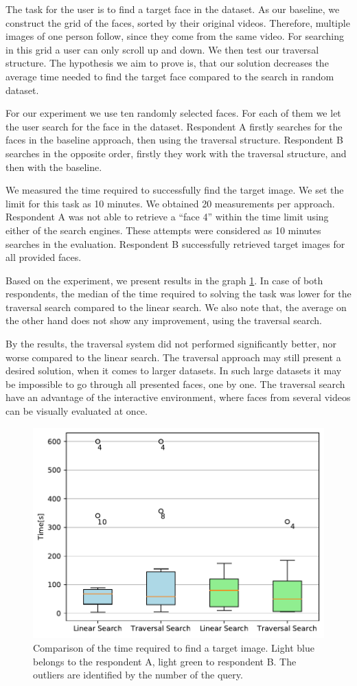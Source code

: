 The task for the user is to find a target face in the dataset. As our baseline, we construct the grid of the faces, sorted by their original videos. Therefore, multiple images of one person follow, since they come from the same video. For searching in this grid a user can only scroll up and down. We then test our traversal structure. The hypothesis we aim to prove is, that our solution decreases the average time needed to find the target face compared to the search in random dataset.

For our experiment we use ten randomly selected faces. For each of them we let the user search for the face in the dataset. Respondent A firstly searches for the faces in the baseline approach, then using the traversal structure. Respondent B searches in the opposite order, firstly they work with the traversal structure, and then with the baseline.

We measured the time required to successfully find the target image. We set the limit for this task as 10 minutes. We obtained 20 measurements per approach. Respondent A was not able to retrieve a ``face 4'' within the time limit using either of the search engines. These attempts were considered as 10 minutes searches in the evaluation. Respondent B successfully retrieved target images for all provided faces.

Based on the experiment, we present results in the graph \ref{fig:search_time}. In case of both respondents, the median of the time required to solving the task was lower for the traversal search compared to the linear search. We also note that, the average on the other hand does not show any improvement, using the traversal search.

By the results, the traversal system did not performed significantly better, nor worse compared to the linear search. The traversal approach may still present a desired solution, when it comes to larger datasets. In such large datasets it may be impossible to go through all presented faces, one by one. The traversal search have an advantage of the interactive environment, where faces from several videos can be visually evaluated at once.

\begin{figure}
    \centering
    \includegraphics[width=0.7\linewidth]{graphs/face_search_time.pdf}
    \caption{Comparison of the time required to find a target image. Light blue belongs to the respondent A, light green to respondent B. The outliers are identified by the number of the query.}
    \label{fig:search_time}
\end{figure}